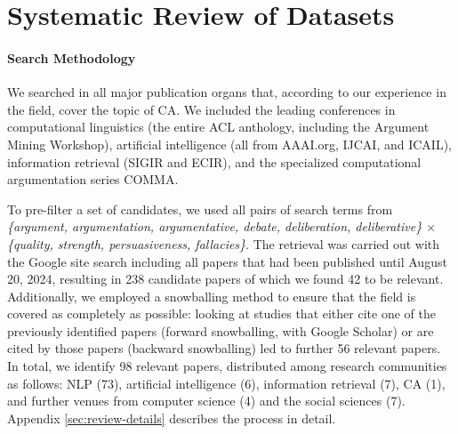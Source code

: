 \section{Systematic Review of Datasets}
\label{sec:review}

\paragraph{Search Methodology}
We searched in all major publication organs that, according to our experience in the field, cover the topic of CA. We included the leading conferences in computational linguistics (the entire ACL anthology, including the  Argument Mining Workshop), artificial intelligence (all from AAAI.org, IJCAI, and ICAIL), information retrieval (SIGIR and ECIR), and the specialized computational argumentation series COMMA.

To pre-filter a set of candidates, we used all pairs of search terms from \textit{\{argument, argumentation, argumentative, debate, deliberation, deliberative\} $\times$ \{quality, strength, persuasiveness, fallacies\}}. The retrieval was carried out with the Google site search including all papers that had been published until August 20, 2024, resulting in 238 candidate papers of which we found 42 to be relevant. Additionally, we employed a snowballing method \cite{wohlin2014snowballing} to ensure that the field is covered as completely as possible: looking at studies that either cite one of the previously identified papers (forward snowballing, with Google Scholar) or are cited by those papers (backward snowballing) led to further 56 relevant papers. In total, we identify 98 relevant papers, distributed among research communities as follows: NLP (73), artificial intelligence (6), information retrieval (7), CA (1), and further venues from computer science (4) and the social sciences (7). Appendix \ref{sec:review-details} describes the process in detail.

